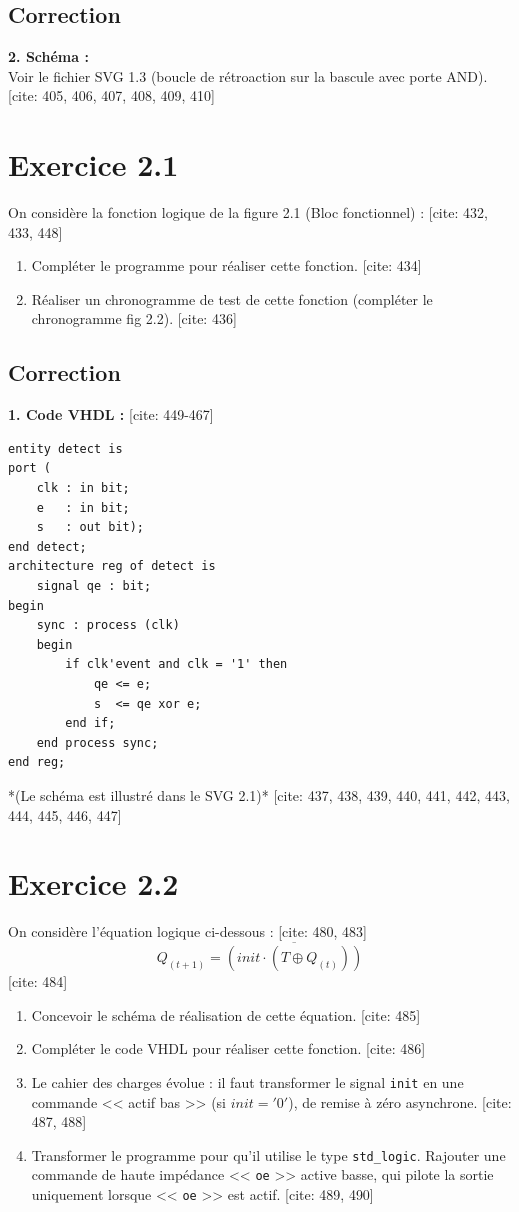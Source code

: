 \documentclass[11pt,a4paper]{article}
\begin{document}
\subsection*{Correction}
\textbf{2. Schéma :}\\
Voir le fichier SVG 1.3 (boucle de rétroaction sur la bascule avec porte AND). [cite: 405, 406, 407, 408, 409, 410]

\section*{Exercice 2.1}
On considère la fonction logique de la figure 2.1 (Bloc fonctionnel) : [cite: 432, 433, 448]
\begin{enumerate}
    \item Compléter le programme pour réaliser cette fonction. [cite: 434]
    \item Réaliser un chronogramme de test de cette fonction (compléter le chronogramme fig 2.2). [cite: 436]
\end{enumerate}

\subsection*{Correction}
\textbf{1. Code VHDL :} [cite: 449-467]
\begin{lstlisting}
entity detect is
port (
    clk : in bit;
    e   : in bit;
    s   : out bit);
end detect;
architecture reg of detect is
    signal qe : bit;
begin
    sync : process (clk)
    begin
        if clk'event and clk = '1' then
            qe <= e;
            s  <= qe xor e;
        end if;
    end process sync;
end reg;
\end{lstlisting}
*(Le schéma est illustré dans le SVG 2.1)* [cite: 437, 438, 439, 440, 441, 442, 443, 444, 445, 446, 447]

\section*{Exercice 2.2}
On considère l'équation logique ci-dessous : [cite: 480, 483]
$$Q_{(t+1)} = \overline{(init \cdot (T \oplus Q_{(t)}))}$$ [cite: 484]
\begin{enumerate}
    \item Concevoir le schéma de réalisation de cette équation. [cite: 485]
    \item Compléter le code VHDL pour réaliser cette fonction. [cite: 486]
    \item Le cahier des charges évolue : il faut transformer le signal \texttt{init} en une commande << actif bas >> (si $init='0'$), de remise à zéro asynchrone. [cite: 487, 488]
    \item Transformer le programme pour qu'il utilise le type \texttt{std\_logic}. Rajouter une commande de haute impédance << \texttt{oe} >> active basse, qui pilote la sortie uniquement lorsque << \texttt{oe} >> est actif. [cite: 489, 490]
\end{enumerate}
\end{document}
